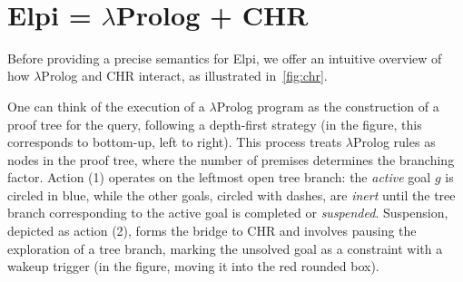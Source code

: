 \documentclass[a4paper, 11pt]{book}
\newenvironment{elpicode}
  {\VerbatimEnvironment~\\\begin{elpibox}\begin{xelpicode}}{\end{xelpicode}
\end{elpibox}\\}
\begin{document}








\newpage
~
\newpage
\section{Elpi = $\lambda$Prolog + CHR}\label{sec:elpiLP+CHR}


Before providing a precise semantics for Elpi, we offer an intuitive overview of
how $\lambda$Prolog and CHR interact, as illustrated in~\cref{fig:chr}.

One can think of the execution of a $\lambda$Prolog program as the construction
of a proof tree for the query, following a depth-first strategy (in the figure,
this corresponds to bottom-up, left to right). This process treats
$\lambda$Prolog rules as nodes in the proof tree, where the number of premises
determines the branching factor. Action (1) operates on the leftmost open tree
branch: the \emph{active} goal $g$ is circled in blue, while the other goals,
circled with dashes, are \emph{inert} until the tree branch corresponding to the
active goal is completed or \emph{suspended}. Suspension, depicted as action (2),
forms the bridge to CHR and involves pausing the exploration of a tree branch,
marking the unsolved goal as a constraint with a wakeup trigger (in the figure,
moving it into the red rounded box).
\end{document}
